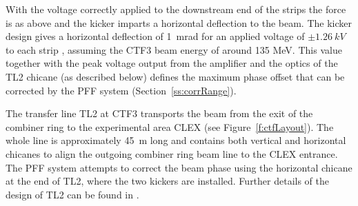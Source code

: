 With the voltage correctly applied to the downstream end of the strips the force is as above and the kicker imparts a horizontal deflection to the beam. The kicker design gives a horizontal deflection of 1~mrad for an applied voltage of \(\pm1.26~kV\) to each strip \cite{kickerIPAC11}, assuming the CTF3 beam energy of around 135 MeV. This value together with the peak voltage output from the amplifier and the optics of the TL2 chicane (as described below) defines the maximum phase offset that can be corrected by the PFF system (Section~\ref{ss:corrRange}).




The transfer line TL2 at CTF3 transports the beam from the exit of the combiner ring to the experimental area CLEX (see Figure~\ref{f:ctfLayout}). The whole line is approximately 45~m long and contains both vertical and horizontal chicanes to align the outgoing combiner ring beam line to the CLEX entrance. The PFF system attempts to correct the beam phase using the horizontal chicane at the end of TL2, where the two kickers are installed. Further details of the design of TL2 can be found in \cite{tl2}.



